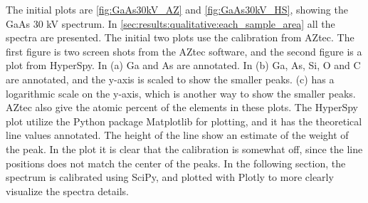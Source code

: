 The initial plots are \cref{fig:GaAs30kV_AZ} and \cref{fig:GaAs30kV_HS}, showing the GaAs 30 kV spectrum.
In \cref{sec:results:qualitative:each_sample_area} all the spectra are presented.
The initial two plots use the calibration from AZtec.
The first figure is two screen shots from the AZtec software, and the second figure is a plot from HyperSpy.
In (a) Ga and As are annotated.
In (b) Ga, As, Si, O and C are annotated, and the y-axis is scaled to show the smaller peaks.
(c) has a logarithmic scale on the y-axis, which is another way to show the smaller peaks.
AZtec also give the atomic percent of the elements in these plots.
The HyperSpy plot utilize the Python package Matplotlib for plotting, and it has the theoretical line values annotated.
The height of the line show an estimate of the weight of the peak.
In the plot it is clear that the calibration is somewhat off, since the line positions does not match the center of the peaks.
In the following section, the spectrum is calibrated using SciPy, and plotted with Plotly to more clearly visualize the spectra details.

